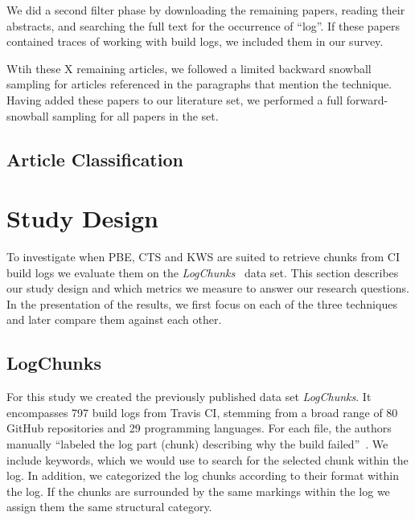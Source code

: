 We did a second filter phase by downloading the remaining papers,
reading their abstracts, and searching the full text for the
occurrence of ``log''. If these papers contained traces of working
with build logs, we included them in our survey.

Wtih these X remaining articles, we followed a limited backward
snowball sampling for articles referenced in the paragraphs that
mention the technique. Having added these papers to our literature
set, we performed a full forward-snowball sampling for all papers in
the set.

\subsection{Article Classification}

\section{Study Design}
\label{sec:study}
To investigate when PBE, CTS and KWS are suited to retrieve chunks from CI build
logs we evaluate them on the \emph{LogChunks}~\cite{brandt2020logchunks} data set.
This section describes our study design and which metrics we measure to answer our research questions.
In the presentation of the results, we first focus on each of the three techniques and later compare them against each other.

\subsection{LogChunks}
For this study we created the previously published data set \emph{LogChunks}.
It encompasses 797 build logs from Travis CI, stemming from a broad range of 80
GitHub repositories and 29 programming languages. For each file, the authors
manually ``labeled the log part (chunk) describing why the build failed''~\cite{brandt2020logchunks}.
We include keywords, which we would use to search for the selected chunk
within the log. In addition, we categorized the log chunks according to their
format within the log. If the chunks are surrounded by the same markings within
the log we assign them the same structural category.

